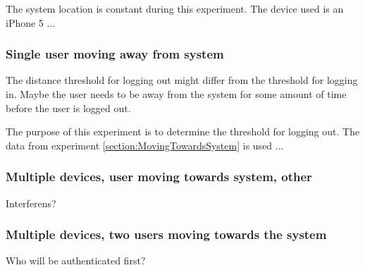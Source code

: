 The system location is constant during this experiment. The device used is an iPhone 5 ...

\subsubsection{Single user moving away from system}
The distance threshold for logging out might differ from the threshold for logging in. Maybe the user needs to be away from the system for some amount of time before the user is logged out. 

The purpose of this experiment is to determine the threshold for logging out. The data from experiment \ref{section:MovingTowardsSystem} is used ...


\subsubsection{Multiple devices, user moving towards system, other}
Interferens?

\subsubsection{Multiple devices, two users moving towards the system}
Who will be authenticated first?
